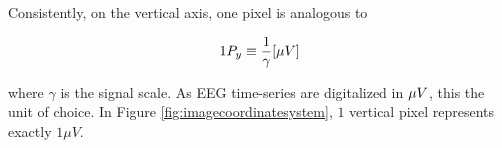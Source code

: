 Consistently, on the vertical axis, one pixel is analogous to 

\begin{equation}
1 P_y \equiv \frac{1}{\gamma}  [\si\mu{V}]
\label{eq:resolutiony}
\end{equation}

\noindent where $\gamma$ is the signal scale.  As EEG time-series are digitalized in $\si\mu{V}$, this the unit of choice.  In Figure \ref{fig:imagecoordinatesystem}, $1$ vertical pixel represents exactly $1 \mu V$.
